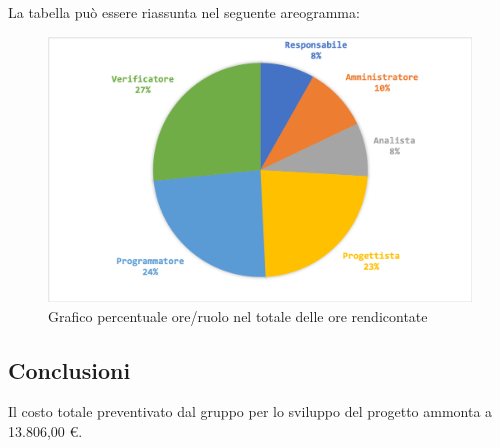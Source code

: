 				La tabella può essere riassunta nel seguente areogramma:
				\begin{figure}[H]
					\centering
					\includegraphics[width=0.8\linewidth]{./images/preventivo/totOreRed2.png}
					\caption{Grafico percentuale ore/ruolo nel totale delle ore rendicontate}
					\label{fig:grafico costi ruolo fase totale ore rendicontate}
				\end{figure}
			
			\subsection{Conclusioni}
				Il costo totale preventivato dal gruppo per lo sviluppo del progetto ammonta a 13.806,00 €.
				
				
		
	
	